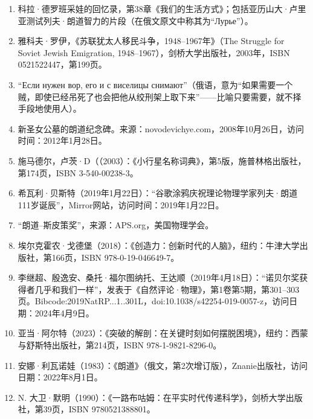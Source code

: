 \begin{enumerate}
\item 科拉·德罗班采娃的回忆录，第38章《我们的生活方式》；包括亚历山大·卢里亚测试列夫·朗道智力的片段（在俄文原文中称其为“Лурье”）。
\item 雅科夫·罗伊，《苏联犹太人移民斗争，1948–1967年》（The Struggle for Soviet Jewish Emigration, 1948–1967），剑桥大学出版社，2003年，ISBN 0521522447，第199页。
\item “Если нужен вор, его и с виселицы снимают”（俄语，意为“如果需要一个贼，即使已经吊死了也会把他从绞刑架上取下来”——比喻只要需要，就不择手段地使用人）。
\item 新圣女公墓的朗道纪念碑。来源：novodevichye.com，2008年10月26日，访问时间：2012年1月28日。
\item 施马德尔，卢茨·D（（2003）：《小行星名称词典》，第5版，施普林格出版社，第174页，ISBN 3-540-00238-3。
\item 希瓦利·贝斯特（2019年1月22日）：“谷歌涂鸦庆祝理论物理学家列夫·朗道111岁诞辰”，Mirror网站，访问时间：2019年1月22日。
\item “朗道–斯皮策奖”，来源：APS.org，美国物理学会。
\item 埃尔克霍农·戈德堡（2018）：《创造力：创新时代的人脑》，纽约：牛津大学出版社，第166页，ISBN 978-0-19-046649-7。
\item 李继超、殷逸安、桑托·福尔图纳托、王达顺（2019年4月18日）：“诺贝尔奖获得者几乎和我们一样”，发表于《自然评论·物理》，第1卷第5期，第301–303页。Bibcode:2019NatRP...1..301L，doi:10.1038/s42254-019-0057-z，访问日期：2024年4月9日。
\item 亚当·阿尔特（2023）：《突破的解剖：在关键时刻如何摆脱困境》，纽约：西蒙与舒斯特出版社，第214页，ISBN 978-1-9821-8296-0。
\item 安娜·利瓦诺娃（1983）：《朗道》（俄文，第2次增订版），Znanie出版社，访问日期：2022年8月1日。
\item N. 大卫·默明（1990）：《一路布咕姆：在平实时代传递科学》，剑桥大学出版社，第39页，ISBN 9780521388801。
\end{enumerate}
